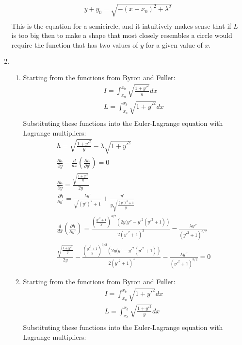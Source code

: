 \documentclass[12pt]{article}
\begin{document}
\begin{enumerate}
\begin{gather*}
      y+y_0=\sqrt{-(x+x_0)^2+\lambda^2}\\
    \end{gather*}
    This is the equation for a semicircle, and it intuitively makes sense that if $L$ is too big then to make a shape that most closely resembles a circle would require the function that has two values of $y$ for a given value of $x$.
    \item
    \begin{enumerate}
      \item
      Starting from the functions from Byron and Fuller:
      \begin{gather*}
        I=\int_{x_a}^{x_b}\sqrt{\frac{1+y'^2}{y}}dx\\
        L=\int_{x_a}^{x_b}\sqrt{1+y'^2}dx\\
      \end{gather*}
      Substituting these functions into the Euler-Lagrange equation with Lagrange multipliers:
      \begin{gather*}
        h=\sqrt{\frac{1+y'^2}{y}}-\lambda\sqrt{1+y'^2}\\
        \frac{\partial h}{\partial y}-\frac{d}{dx}\left(\frac{\partial h}{\partial y'}\right)=0\\
        \frac{\partial h}{\partial y}=\frac{\sqrt{\frac{1+y'^2}{y}}}{2 y}\\
        \frac{\partial h}{\partial y'}=\frac{\lambda  y'}{\sqrt{\left(y'\right)^2+1}}+\frac{y'}{y \sqrt{\frac{\left(y'\right)^2+1}{y}}}\\
        \frac{d}{dx}\left(\frac{\partial h}{\partial y'}\right)=\frac{\left(\frac{y'^2+1}{y}\right)^{3/2} \left(2 y( y''-y'^2 \left(y'^2+1\right)\right)}{2 \left(y'^2+1\right)^3}-\frac{\lambda  y''}{\left(y'^2+1\right)^{3/2}}\\
        \frac{\sqrt{\frac{1+y'^2}{y}}}{2 y}-\frac{\left(\frac{y'^2+1}{y}\right)^{3/2} \left(2 y( y''-y'^2 \left(y'^2+1\right)\right)}{2 \left(y'^2+1\right)^3}-\frac{\lambda  y''}{\left(y'^2+1\right)^{3/2}}=0
      \end{gather*}
      \item
      Starting from the functions from Byron and Fuller:
      \begin{gather*}
        I=\int_{x_a}^{x_b}\sqrt{1+y'^2}dx\\
        L=\int_{x_a}^{x_b}\sqrt{\frac{1+y'^2}{y}}dx\\
      \end{gather*}
      Substituting these functions into the Euler-Lagrange equation with Lagrange multipliers:

\end{enumerate}
\end{enumerate}
\end{document}
